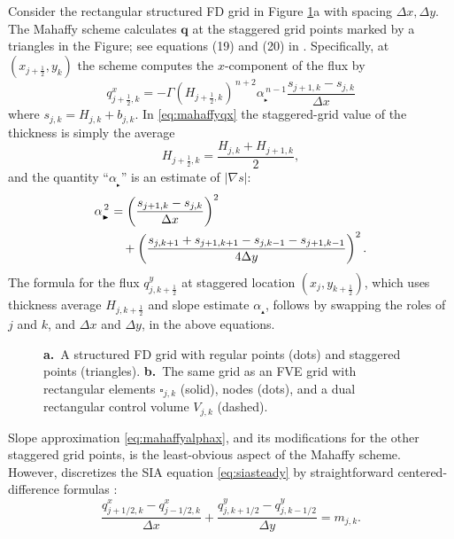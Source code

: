 \documentclass[twocolumn,letterpaper]{igs}
\newcommand\bq{\mathbf{q}}
\newcommand{\grad}{\nabla}
\newcommand\alpharight{\alpha_{{}_{\blacktriangleright}}}
\newcommand\alphaup{\alpha_{{\!}_{\blacktriangle}}}
\newcommand{\half}{\tfrac{1}{2}}
\begin{document}
Consider the rectangular structured FD grid in Figure \ref{fig:fdfemgrids}a with spacing $\Delta x,\Delta y$.  The Mahaffy scheme calculates $\bq$ at the staggered grid points marked by a triangles in the Figure; see equations (19) and (20) in \cite{Mahaffy1976}.  Specifically, at $(x_{j+\half},y_k)$ the scheme computes the $x$-component of the flux by
\begin{equation}
q^x_{j+\half,k} = - \Gamma (H_{j+\half,k})^{\,n+2} \alpharight^{\,n-1} \frac{s_{j+1,k} - s_{j,k}}{\Delta x}  \label{eq:mahaffyqx}
\end{equation}
where $s_{j,k} = H_{j,k} + b_{j,k}$.  In \eqref{eq:mahaffyqx} the staggered-grid value of the thickness is simply the average
\begin{equation}
  H_{j+\half,k} = \frac{H_{j,k} + H_{j+1,k}}{2},  \label{eq:mahaffyHav}
\end{equation}
and the quantity ``$\alpharight$\!'' is an estimate of $|\grad s|$:
\begin{align}
\alpharight^{\,2} &= \left(\frac{s_{j+1,k} - s_{j,k}}{\Delta x}\right)^2  \label{eq:mahaffyalphax} \\
  &\quad + \left(\frac{s_{j,k+1} + s_{j+1,k+1} - s_{j,k-1} - s_{j+1,k-1}}{4 \Delta y}\right)^2. \notag
\end{align}
The formula for the flux $q^y_{j,k+\half}$ at staggered location $(x_j,y_{k+\half})$, which uses thickness average $H_{j,k+\half}$ and slope estimate $\alphaup$, follows by swapping the roles of $j$ and $k$, and $\Delta x$ and $\Delta y$, in the above equations.

\begin{figure}[ht]
\begin{center}
 \quad 
\end{center}
\caption{\textbf{a.}~A structured FD grid with regular points (dots) and staggered points (triangles).  \textbf{b.}~The same grid as an FVE grid with rectangular elements $\square_{j,k}$ (solid), nodes (dots), and a dual rectangular control volume $V_{j,k}$ (dashed).}
\label{fig:fdfemgrids}
\end{figure}

Slope approximation \eqref{eq:mahaffyalphax}, and its modifications for the other staggered grid points, is the least-obvious aspect of the Mahaffy scheme.  However, \cite{Mahaffy1976} discretizes the SIA equation \eqref{eq:siasteady} by straightforward centered-difference formulas \citep{MortonMayers2005}:
\begin{equation}
\frac{q^x_{j+1/2,k} - q^x_{j-1/2,k}}{\Delta x} + \frac{q^y_{j,k+1/2}- q^y_{j,k-1/2}}{\Delta y} = m_{j,k}.  \label{eq:siasteadyfd}
\end{equation}
\end{document}
